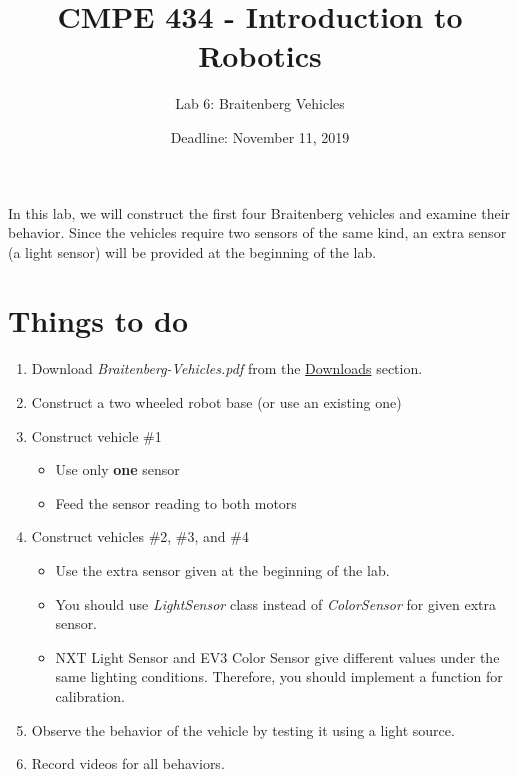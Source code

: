 \documentclass{scrartcl}
\title{CMPE 434 - Introduction to Robotics}
\subtitle{Lab 6: Braitenberg Vehicles}
\date{Deadline: November 11, 2019}
\begin{document}
\maketitle

In this lab, we will construct the first four Braitenberg vehicles and examine their behavior. Since the vehicles require two sensors of the same kind, an extra sensor (a light sensor) will be provided at the beginning of the lab.

\section{Things to do}

\begin{enumerate}
    \def\labelenumi{\arabic{enumi}.}
    \item Download \textit{Braitenberg-Vehicles.pdf} from the \href{http://robot.cmpe.boun.edu.tr/~cmpe434/doku.php?id=downloads#control}{Downloads} section.
    \item Construct a two wheeled robot base (or use an existing one)
    \item Construct vehicle \#1

    \begin{itemize} 
        \item Use only \textbf{one} sensor
        \item Feed the sensor reading to both motors
    \end{itemize}

    \def\labelenumi{\arabic{enumi}.}
    \item Construct vehicles \#2, \#3, and \#4
    \begin{itemize}
        \item Use the extra sensor given at the beginning of the lab.
        \item You should use \textit{LightSensor} class instead of \textit{ColorSensor} for given extra sensor.
        \item  NXT Light Sensor and EV3 Color Sensor give different values under the same lighting conditions. Therefore, you should implement a function for calibration.
    \end{itemize}

    \def\labelenumi{\arabic{enumi}.}
    \item Observe the behavior of the vehicle by testing it using a light source.
    \item Record videos for all behaviors.
\end{enumerate}
\end{document}
